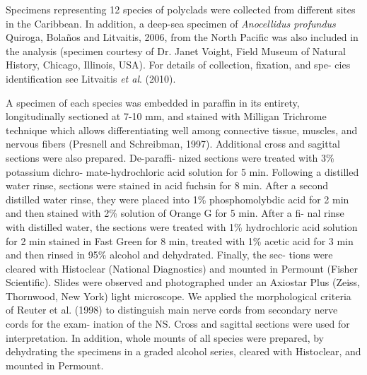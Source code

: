 \begin{multicols}{2}

\lipsum



\par{}Specimens representing 12 species of polyclads were
collected from different sites in the Caribbean. In addition,
a deep-sea specimen of \textit{Anocellidus profundus} Quiroga,
Bolaños and Litvaitis, 2006, from the North Pacific was
also included in the analysis (specimen courtesy of Dr.
Janet Voight, Field Museum of Natural History, Chicago,
Illinois, USA). For details of collection, fixation, and spe-
cies identification see Litvaitis \textit{et al}. (2010).


\par{}A specimen of each species was embedded in paraffin
in its entirety, longitudinally sectioned at 7-10 mm, and
stained with Milligan Trichrome technique which allows
differentiating well among connective tissue, muscles, and
nervous fibers (Presnell and Schreibman, 1997). Additional
cross and sagittal sections were also prepared. De-paraffi-
nized sections were treated with 3\% potassium dichro-
mate-hydrochloric acid solution for 5 min. Following a
distilled water rinse, sections were stained in acid fuchsin
for 8 min. After a second distilled water rinse, they were
placed into 1\% phosphomolybdic acid for 2 min and then
stained with 2\% solution of Orange G for 5 min. After a fi-
nal rinse with distilled water, the sections were treated with
1\% hydrochloric acid solution for 2 min stained in Fast
Green for 8 min, treated with 1\% acetic acid for 3 min and
then rinsed in 95\% alcohol and dehydrated. Finally, the sec-
tions were cleared with Histoclear (National Diagnostics)
and mounted in Permount (Fisher Scientific). Slides were
observed and photographed under an Axiostar Plus (Zeiss,
Thornwood, New York) light microscope. We applied the
morphological criteria of Reuter et al. (1998) to distinguish
main nerve cords from secondary nerve cords for the exam-
ination of the NS. Cross and sagittal sections were used for
interpretation. In addition, whole mounts of all species
were prepared, by dehydrating the specimens in a graded
alcohol series, cleared with Histoclear, and mounted in
Permount.

\lipsum


\end{multicols}
